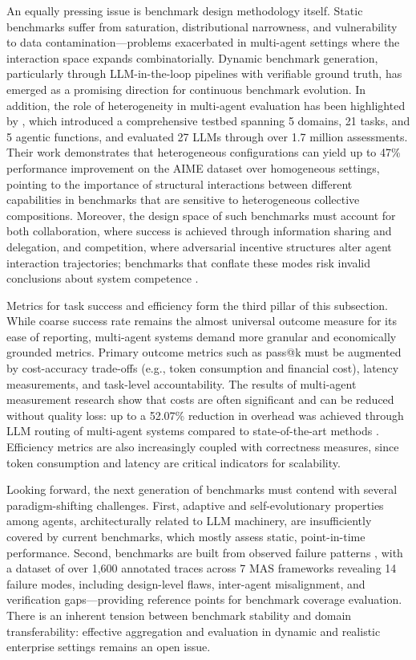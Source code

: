 \documentclass[11pt,a4paper]{article}
\begin{document}
An equally pressing issue is benchmark design methodology itself. Static benchmarks suffer from saturation, distributional narrowness, and vulnerability to data contamination---problems exacerbated in multi-agent settings where the interaction space expands combinatorially. Dynamic benchmark generation, particularly through LLM-in-the-loop pipelines with verifiable ground truth, has emerged as a promising direction for continuous benchmark evolution. In addition, the role of heterogeneity in multi-agent evaluation has been highlighted by \cite{arxiv:2505.16997v1}, which introduced a comprehensive testbed spanning 5 domains, 21 tasks, and 5 agentic functions, and evaluated 27 LLMs through over 1.7 million assessments. Their work demonstrates that heterogeneous configurations can yield up to 47\% performance improvement on the AIME dataset over homogeneous settings, pointing to the importance of structural interactions between different capabilities in benchmarks that are sensitive to heterogeneous collective compositions. Moreover, the design space of such benchmarks must account for both collaboration, where success is achieved through information sharing and delegation, and competition, where adversarial incentive structures alter agent interaction trajectories; benchmarks that conflate these modes risk invalid conclusions about system competence \cite{arxiv:2503.01935v1}.

Metrics for task success and efficiency form the third pillar of this subsection. While coarse success rate remains the almost universal outcome measure for its ease of reporting, multi-agent systems demand more granular and economically grounded metrics. Primary outcome metrics such as pass@k must be augmented by cost-accuracy trade-offs (e.g., token consumption and financial cost), latency measurements, and task-level accountability. The results of multi-agent measurement research show that costs are often significant and can be reduced without quality loss: up to a 52.07\% reduction in overhead was achieved through LLM routing of multi-agent systems compared to state-of-the-art methods \cite{arxiv:2502.11133v1}. Efficiency metrics are also increasingly coupled with correctness measures, since token consumption and latency are critical indicators for scalability.

Looking forward, the next generation of benchmarks must contend with several paradigm-shifting challenges. First, adaptive and self-evolutionary properties among agents, architecturally related to LLM machinery, are insufficiently covered by current benchmarks, which mostly assess static, point-in-time performance. Second, benchmarks are built from observed failure patterns \cite{arxiv:2503.13657v3}, with a dataset of over 1,600 annotated traces across 7 MAS frameworks revealing 14 failure modes, including design-level flaws, inter-agent misalignment, and verification gaps---providing reference points for benchmark coverage evaluation. There is an inherent tension between benchmark stability and domain transferability: effective aggregation and evaluation in dynamic and realistic enterprise settings remains an open issue.
\end{document}
